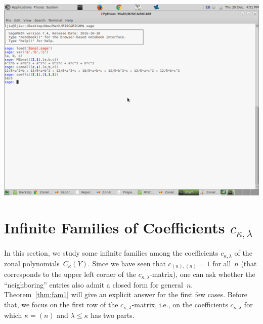 \documentclass[10pt,oneside,american]{amsart}
\numberwithin{equation}{section}
\numberwithin{figure}{section}
\theoremstyle{plain}
\theoremstyle{definition}
\theoremstyle{remark}
\theoremstyle{plain}
\theoremstyle{definition}
\theoremstyle{plain}
\theoremstyle{plain}
\begin{document}
\includegraphics[scale=0.3]{ScreenShot}


\section{Infinite Families of Coefficients $c_{\kappa,\lambda}$}

In this section, we study some infinite families among the coefficients
$c_{\kappa,\lambda}$ of the zonal polynomials~$C_{\kappa}(Y)$. Since we have
seen that $c_{(n),(n)}=1$ for all~$n$ (that corresponds to the upper left
corner of the $c_{\kappa,\lambda}$-matrix), one can ask whether the
``neighboring'' entries also admit a closed form for general~$n$.
Theorem~\ref{thm:fam1} will give an explicit answer for the first few cases.
Before that, we focus on the first row of the $c_{\kappa,\lambda}$-matrix,
i.e., on the coefficients $c_{\kappa,\lambda}$ for which
$\kappa=\left(n\right)$ and $\lambda\leq\kappa$ has two parts.
\end{document}
